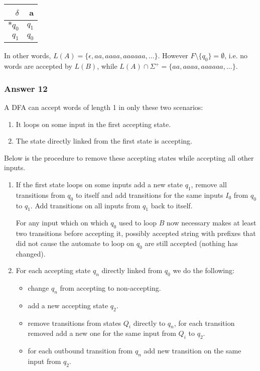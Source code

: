 \documentclass[11pt]{article}
\begin{document}
\begin{center}
\begin{tabular}{r|r}
\(\delta\) & a\\
\hline
\(*q_0\) & \(q_1\)\\
\(q_1\) & \(q_0\)\\
\end{tabular}
\end{center}

In other words, \(L(A) = \{\epsilon, aa, aaaa, aaaaaa, \dots\}\).  However
\(F \setminus \{q_0\} = \emptyset\), i.e. no words are accepted by \(L(B)\),
while \(L(A) \cap \Sigma^+ = \{aa, aaaa, aaaaaa, \dots\}\).

\subsubsection{Answer 12}
\label{sec:orgheadline17}
A DFA can accept words of length 1 in only these two scenarios:
\begin{enumerate}
\item It loops on some input in the first accepting state.
\item The state directly linked from the first state is accepting.
\end{enumerate}


Below is the procedure to remove these accepting states while accepting
all other inputs.

\begin{enumerate}
\item If the first state loops on some inputs add a new state \(q_1\), remove
all transitions from \(q_0\) to itself and add transitions for the same
inputs \(I_0\) from \(q_0\) to \(q_1\).  Add transitions on all inputs from
\(q_1\) back to itself.

For any input which on which \(q_0\) used to loop \(B\) now necessary makes
at least two transitions before accepting it, possibly accepted string
with prefixes that did not cause the automate to loop on \(q_0\) are
still accepted (nothing has changed).
\item For each accepting state \(q_n\) directly linked from \(q_0\) we do the
following:
\begin{itemize}
\item change \(q_n\) from accepting to non-accepting.
\item add a new accepting state \(q_2\).
\item remove transitions from states \(Q_i\) directly to \(q_n\), for each
transition removed add a new one for the same input from \(Q_i\) to
\(q_2\).
\item for each outbound transition from \(q_n\) add new transition on the
same input from \(q_2\).
\end{itemize}
\end{enumerate}
\end{document}

